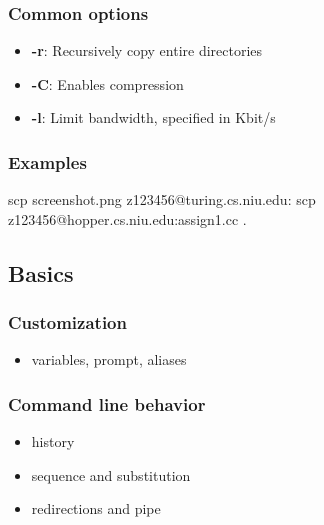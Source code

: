 \documentclass{report}
\begin{document}
    \bigbreak \noindent 
    \subsubsection{Common options}
    \begin{itemize}
        \item \textbf{-r}: Recursively copy entire directories
        \item \textbf{-C}: Enables compression
        \item \textbf{-l}: Limit bandwidth, specified in Kbit/s
    \end{itemize}

    \bigbreak \noindent 
    \subsubsection{Examples}
    \bigbreak \noindent 
    \begin{bashcode}
    scp screenshot.png z123456@turing.cs.niu.edu:
    scp z123456@hopper.cs.niu.edu:assign1.cc .
    \end{bashcode}

    \pagebreak 
    \bigbreak \noindent 
    \subsection{Basics}
    \bigbreak \noindent 
    \subsubsection{Customization}
    \begin{itemize}
        \item variables, prompt, aliases
    \end{itemize}
    \bigbreak \noindent 
    \subsubsection{Command line behavior}
    \begin{itemize}
        \item history
        \item sequence and substitution
        \item redirections and pipe
    \end{itemize}

    \bigbreak \noindent 
\end{document}
